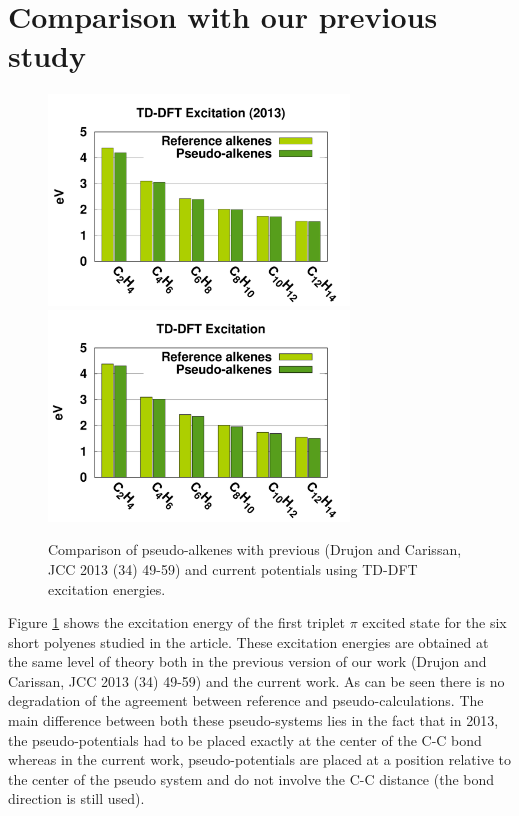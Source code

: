 \documentclass[aip]{revtex4-1}
\begin{document}
\section*{Comparison with our previous study}
\begin{figure}
\begin{center}
\includegraphics[width=8cm]{short_pbe0_tddft_2013}
\includegraphics[width=8cm]{short_pbe0_tddft}
\end{center}
\caption{Comparison of pseudo-alkenes with previous (Drujon and Carissan, JCC 2013 (34) 49-59) and current potentials using TD-DFT excitation energies.}
\label{fig:alkenes_tddft}
\end{figure}
Figure \ref{fig:alkenes_tddft} shows the excitation energy of the first triplet $\pi$ excited state
for the six short polyenes studied in the article.
These excitation energies are obtained at the same level of theory both in the previous
version of our work (Drujon and Carissan, JCC 2013 (34) 49-59) and the current work.
As can be seen there is no degradation of the agreement between reference and pseudo-calculations.
The main difference between both these pseudo-systems lies in the fact that in 2013, the pseudo-potentials
had to be placed exactly at the center of the C-C bond whereas in the current work, pseudo-potentials
are placed at a position relative to the center of the pseudo system and do not involve
the C-C distance (the bond direction is still used).
\end{document}
